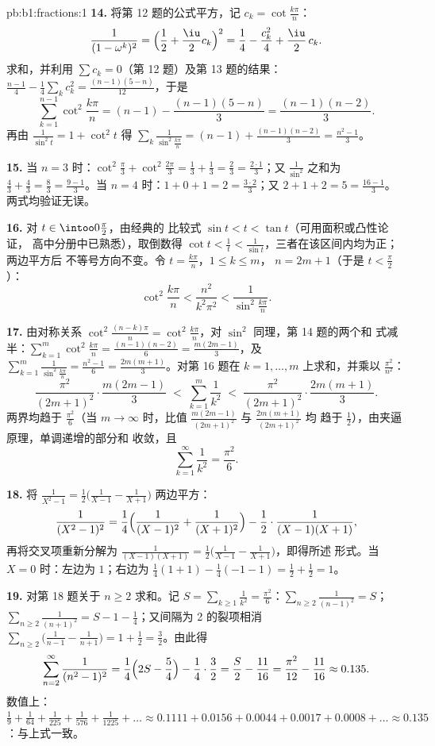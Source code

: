\begin{solution}{pb:b1:fractions:1}
\textbf{14.} 将第 12 题的公式平方，记 $c_k =
\cot\frac{k\pi}n$：
\[
\frac1{(1-\omega^k)^2}
= \Bigl(\frac12 + \frac\iu2 c_k\Bigr)^2
= \frac14 - \frac{c_k^2}4 + \frac\iu2\,c_k .
\]
求和，并利用 $\sum c_k = 0$（第 12 题）及第 13 题的结果：
$\frac{n-1}4 - \frac14\sum_k c_k^2 = \frac{(n-1)(5-n)}{12}$，于是
\[
\sum_{k=1}^{n-1}\cot^2\frac{k\pi}n
= (n-1) - \frac{(n-1)(5-n)}3 = \frac{(n-1)(n-2)}3 .
\]
再由 $\frac1{\sin^2t} = 1 + \cot^2t$ 得
$\sum_k\frac1{\sin^2\frac{k\pi}n} = (n-1) +
\frac{(n-1)(n-2)}3 = \frac{n^2-1}3$。

\textbf{15.} 当 $n = 3$ 时：$\cot^2\frac\pi3 + \cot^2\frac{2\pi}3 =
\frac13 + \frac13 = \frac23 = \frac{2\cdot1}3$；又
$\frac1{\sin^2}$ 之和为 $\frac43 + \frac43 = \frac83 =
\frac{9-1}3$。当 $n = 4$ 时：$1 + 0 + 1 = 2 = \frac{3\cdot2}3$；又 $2
+ 1 + 2 = 5 = \frac{16-1}3$。两式均验证无误。

\textbf{16.} 对 $t \in \intoo0{\frac\pi2}$，由经典的
比较式 $\sin t < t < \tan t$（可用面积或凸性论证，
高中分册中已熟悉），取倒数得 $\cot t <
\frac1t < \frac1{\sin t}$，三者在该区间内均为正；两边平方后
不等号方向不变。令 $t = \frac{k\pi}n$，$1 \leq k \leq m$，
$n = 2m+1$（于是 $t < \frac\pi2$）：
\[
\cot^2\frac{k\pi}n < \frac{n^2}{k^2\pi^2} <
\frac1{\sin^2\frac{k\pi}n} .
\]

\textbf{17.} 由对称关系 $\cot^2\frac{(n-k)\pi}n =
\cot^2\frac{k\pi}n$，对 $\sin^2$ 同理，第 14 题的两个和
式减半：$\sum_{k=1}^{m}\cot^2\frac{k\pi}n = \frac{(n-1)(n-2)}6 =
\frac{m(2m-1)}3$，及 $\sum_{k=1}^m\frac1{\sin^2\frac{k\pi}n} =
\frac{n^2-1}6 = \frac{2m(m+1)}3$。对第 16 题在 $k =
1, \dots, m$ 上求和，并乘以 $\frac{\pi^2}{n^2}$：
\[
\frac{\pi^2}{(2m+1)^2}\cdot\frac{m(2m-1)}3
\;<\; \sum_{k=1}^{m}\frac1{k^2} \;<\;
\frac{\pi^2}{(2m+1)^2}\cdot\frac{2m(m+1)}3 .
\]
两界均趋于 $\frac{\pi^2}6$（当 $m \to \infty$ 时，比值
$\frac{m(2m-1)}{(2m+1)^2}$ 与 $\frac{2m(m+1)}{(2m+1)^2}$ 均
趋于 $\frac12$），由夹逼原理，单调递增的部分和
收敛，且
\[
\sum_{k=1}^{\infty}\frac1{k^2} = \frac{\pi^2}6 .
\]

\textbf{18.} 将 $\frac1{X^2-1} = \frac12\bigl(\frac1{X-1} -
\frac1{X+1}\bigr)$ 两边平方：
\[
\frac1{(X^2-1)^2} = \frac14\Bigl(\frac1{(X-1)^2} +
\frac1{(X+1)^2}\Bigr) - \frac12\cdot\frac1{(X-1)(X+1)} ,
\]
再将交叉项重新分解为 $\frac1{(X-1)(X+1)} =
\frac12\bigl(\frac1{X-1} - \frac1{X+1}\bigr)$，即得所述
形式。当 $X = 0$ 时：左边为 $1$；右边为 $\frac14(1 + 1) -
\frac14(-1 - 1) = \frac12 + \frac12 = 1$。

\textbf{19.} 对第 18 题关于 $n \geq 2$ 求和。记 $S =
\sum_{k\geq1}\frac1{k^2} = \frac{\pi^2}6$：$\sum_{n\geq2}
\frac1{(n-1)^2} = S$；$\sum_{n\geq2}\frac1{(n+1)^2} = S - 1 -
\frac14$；又间隔为 2 的裂项相消 $\sum_{n\geq2}\bigl(
\frac1{n-1} - \frac1{n+1}\bigr) = 1 + \frac12 = \frac32$。由此得
\[
\sum_{n=2}^{\infty}\frac1{(n^2-1)^2}
= \frac14\Bigl(2S - \frac54\Bigr) - \frac14\cdot\frac32
= \frac S2 - \frac{11}{16}
= \frac{\pi^2}{12} - \frac{11}{16} \approx 0.135 .
\]
数值上：$\frac19 + \frac1{64} + \frac1{225} + \frac1{576} +
\frac1{1225} + \dots \approx 0.1111 + 0.0156 + 0.0044 + 0.0017 +
0.0008 + \dots \approx 0.135$：与上式一致。


\end{solution}

